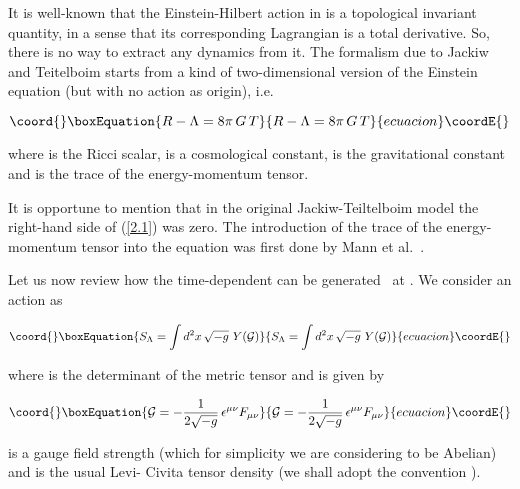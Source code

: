 \documentclass[a4paper,twocolumn,prd,groupedaddress,nofootinbib,showpacs]
{revtex4}
\begin{document}
It is well-known that the Einstein-Hilbert action in \coordHE{} is a
topological invariant quantity, in a sense that its corresponding
Lagrangian is a total derivative. So, there is no way to extract any
dynamics from it. The formalism due to Jackiw and Teitelboim
\cite{Jackiw} starts from a kind of two-dimensional version of the
Einstein equation (but with no action as origin), i.e.

\begin{equation}\coord{}\boxEquation{
R-\Lambda=8\pi\,G\,T
\label{2.1}
}{
R-\Lambda=8\pi\,G\,T
}{ecuacion}\coordE{}\end{equation}

\noindent
where \coordHE{} is the Ricci scalar, \myHighlight{$\Lambda$}\coordHE{} is a cosmological constant,
\coordHE{} is the gravitational constant and \coordHE{} is the trace of the
energy-momentum tensor.

\medskip
It is opportune to mention that in the original Jackiw-Teiltelboim
model the right-hand side of (\ref{2.1}) was zero. The introduction of
the trace of the energy-momentum tensor into the equation was first
done by Mann et al.~\cite{Mann}.

\medskip
Let us now review how the time-dependent \myHighlight{$\Lambda$}\coordHE{} can be
generated~\cite{Novello1,Novello2} at \coordHE{}. We consider an action
\coordHE{} as

\begin{equation}\coord{}\boxEquation{
S_\Lambda=\int d^2x\,\sqrt{-g}\,\,Y({\cal G})
\label{2.2}
}{
S_\Lambda=\int d^2x\,\sqrt{-g}\,\,Y({\cal G})
}{ecuacion}\coordE{}\end{equation}

\noindent
where \coordHE{} is the determinant of the metric tensor and \coordHE{} is
given by~\cite{Novello1}

\begin{equation}\coord{}\boxEquation{
{\cal G}=-\frac{1}{2\sqrt{-g}}\,\epsilon^{\mu\nu}F_{\mu\nu}
\label{2.3}
}{
{\cal G}=-\frac{1}{2\sqrt{-g}}\,\epsilon^{\mu\nu}F_{\mu\nu}
}{ecuacion}\coordE{}\end{equation}

\noindent
{}\coordHE{} is a gauge field strength (which for simplicity we are
considering to be Abelian) and \myHighlight{$\epsilon^{\mu\nu}$}\coordHE{} is the usual Levi-
Civita tensor density (we shall adopt the convention \coordHE{}).
\end{document}
